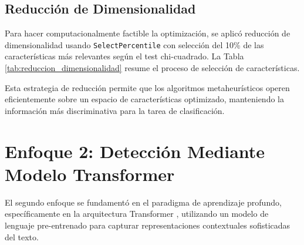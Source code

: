 \subsection{Reducción de Dimensionalidad}

Para hacer computacionalmente factible la optimización, se aplicó reducción de dimensionalidad usando \texttt{SelectPercentile} con selección del 10\% de las características más relevantes según el test chi-cuadrado. La Tabla \ref{tab:reduccion_dimensionalidad} resume el proceso de selección de características.

\begin{table}[htbp]
\centering
{}
\caption{Configuración del proceso de reducción de dimensionalidad.}
\label{tab:reduccion_dimensionalidad}
\end{table}

Esta estrategia de reducción permite que los algoritmos metaheurísticos operen eficientemente sobre un espacio de características optimizado, manteniendo la información más discriminativa para la tarea de clasificación.

\section{Enfoque 2: Detección Mediante Modelo Transformer}
\label{sec:enfoque_transformer}

El segundo enfoque se fundamentó en el paradigma de aprendizaje profundo, específicamente en la arquitectura Transformer \cite{vaswani2017attention}, utilizando un modelo de lenguaje pre-entrenado para capturar representaciones contextuales sofisticadas del texto.


